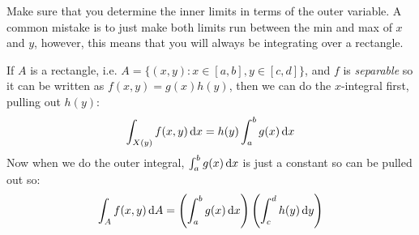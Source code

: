 \documentclass[../main.tex]{subfiles}
\begin{document}
\begin{remark}[Warning]
  Make sure that you determine the inner limits in terms of the outer variable.
  A common mistake is to just make both limits run between the min and max of $x$ and $y$, however, this means that you will always be integrating over a rectangle.
\end{remark}
\begin{remark}
  If $A$ is a rectangle, i.e. $A = \{(x, y): x \in [a, b], y \in [c, d]\}$, and $f$ is \textit{separable} so it can be written as $f(x, y) = g(x)h(y)$, then we can do the $x$-integral first, pulling out $h(y)$:
  \[
    \int_{X(y)} f(x, y) \d{x} = h(y) \int_{a}^{b} g(x) \d{x}
  \]
  Now when we do the outer integral, $\int_{a}^{b} g(x) \d{x}$ is just a constant so can be pulled out so:
  \[
    \int_A f(x, y) \d{A} = \left(\int_{a}^{b} g(x) \d{x}\right)\left(\int_{c}^{d} h(y) \d{y}\right)
  \]
\end{remark}
\end{document}

